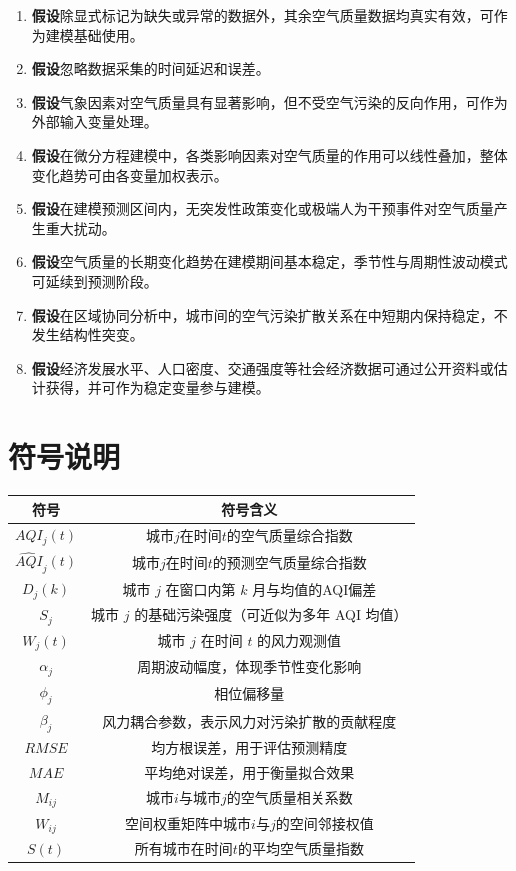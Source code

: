 \documentclass[a4paper,12pt]{article}
\begin{document}
	\begin{enumerate}
		\item \textbf{假设}除显式标记为缺失或异常的数据外，其余空气质量数据均真实有效，可作为建模基础使用。
		
		\item \textbf{假设}忽略数据采集的时间延迟和误差。
		
		\item \textbf{假设}气象因素对空气质量具有显著影响，但不受空气污染的反向作用，可作为外部输入变量处理。
		
		\item \textbf{假设}在微分方程建模中，各类影响因素对空气质量的作用可以线性叠加，整体变化趋势可由各变量加权表示。
		
		\item \textbf{假设}在建模预测区间内，无突发性政策变化或极端人为干预事件对空气质量产生重大扰动。
		
		\item \textbf{假设}空气质量的长期变化趋势在建模期间基本稳定，季节性与周期性波动模式可延续到预测阶段。
		
		\item \textbf{假设}在区域协同分析中，城市间的空气污染扩散关系在中短期内保持稳定，不发生结构性突变。
		
		\item \textbf{假设}经济发展水平、人口密度、交通强度等社会经济数据可通过公开资料或估计获得，并可作为稳定变量参与建模。
	\end{enumerate}
	
	
	\section{符号说明}
	\label{sec:notation}
	\begin{center}
		\begin{tabular}{c c}
			\toprule
			符号 & 符号含义 \\
			\midrule
			$AQI_j(t)$ & 城市$j$在时间$t$的空气质量综合指数 \\
			$\widehat{AQI}_j(t)$ & 城市$j$在时间$t$的预测空气质量综合指数 \\
			$D_j(k)$ & 城市 $j$ 在窗口内第 $k$ 月与均值的AQI偏差 \\
		  	$S_j$ & 城市 $j$ 的基础污染强度（可近似为多年 AQI 均值）\\
			$W_j(t)$ & 城市 $j$ 在时间 $t$ 的风力观测值\\
			$\alpha_j$ & 周期波动幅度，体现季节性变化影响\\
			$\phi_j$ & 相位偏移量\\
			$\beta_j$ & 风力耦合参数，表示风力对污染扩散的贡献程度\\
			$RMSE$ & 均方根误差，用于评估预测精度 \\
			$MAE$ & 平均绝对误差，用于衡量拟合效果 \\
			$M_{ij}$ & 城市$i$与城市$j$的空气质量相关系数 \\
			$W_{ij}$ & 空间权重矩阵中城市$i$与$j$的空间邻接权值 \\
			$S(t)$ & 所有城市在时间$t$的平均空气质量指数 \\
			\bottomrule
		\end{tabular}
	\end{center}
	
\end{document}
